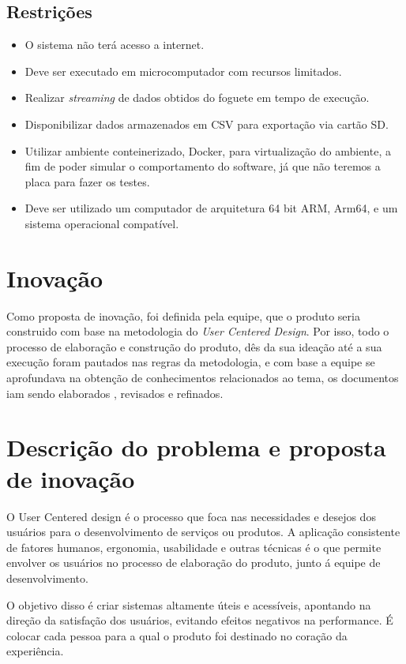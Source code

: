 \subsection{Restrições}

\begin{itemize}
    \item O sistema não terá acesso a internet.
    \item Deve ser executado em microcomputador com recursos limitados.
    \item Realizar  \textit{streaming} de dados obtidos do foguete em tempo de execução.
    \item Disponibilizar dados armazenados em CSV para exportação via cartão SD.
    \item Utilizar ambiente conteinerizado, Docker, para virtualização do ambiente, a fim de poder simular o comportamento do software, já que não teremos a placa para fazer os testes.
    \item Deve ser utilizado um computador de arquitetura 64 bit ARM, Arm64, e um sistema operacional compatível.
\end{itemize}

\section{Inovação}
Como proposta de inovação, foi definida pela equipe, que o produto seria construido com base na metodologia do \textit{User Centered Design}. Por isso, todo o processo de elaboração e construção do produto, dês da sua ideação até a sua execução foram pautados nas regras da metodologia, e com base a equipe se aprofundava na obtenção de conhecimentos relacionados ao tema, os documentos iam sendo elaborados , revisados e refinados.

\section{Descrição do problema e proposta de inovação}

O User Centered design é o processo que foca nas necessidades e desejos dos usuários para o desenvolvimento de serviços ou produtos. A aplicação consistente de fatores humanos, ergonomia, usabilidade e outras técnicas é o que permite envolver os usuários no processo de elaboração do produto, junto á equipe de desenvolvimento.

O objetivo disso é criar sistemas altamente úteis e acessíveis, apontando na direção da satisfação dos usuários, evitando efeitos negativos na performance. É colocar cada pessoa para a qual o produto foi destinado no coração da experiência.

